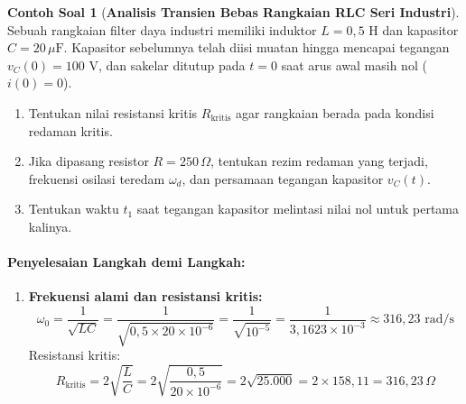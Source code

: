 \documentclass[11pt,a4paper]{article}
\theoremstyle{definition}
\newtheorem{example}{Contoh Soal}[section]
\begin{document}
\begin{example}[\textbf{Analisis Transien Bebas Rangkaian RLC Seri Industri}]
Sebuah rangkaian filter daya industri memiliki induktor $L = 0{,}5\text{ H}$ dan kapasitor $C = 20\,\mu\text{F}$. Kapasitor sebelumnya telah diisi muatan hingga mencapai tegangan $v_C(0) = 100\text{ V}$, dan sakelar ditutup pada $t = 0$ saat arus awal masih nol ($i(0) = 0$).
\begin{enumerate}[label=(\alph*)]
    \item Tentukan nilai resistansi kritis $R_{\text{kritis}}$ agar rangkaian berada pada kondisi redaman kritis.
    \item Jika dipasang resistor $R = 250\,\Omega$, tentukan rezim redaman yang terjadi, frekuensi osilasi teredam $\omega_d$, dan persamaan tegangan kapasitor $v_C(t)$.
    \item Tentukan waktu $t_1$ saat tegangan kapasitor melintasi nilai nol untuk pertama kalinya.
\end{enumerate}

\paragraph{Penyelesaian Langkah demi Langkah:}
\begin{enumerate}[label=(\alph*), leftmargin=*]
    \item \textbf{Frekuensi alami dan resistansi kritis:}
    \begin{equation*}
        \omega_0 = \frac{1}{\sqrt{LC}} = \frac{1}{\sqrt{0{,}5 \times 20 \times 10^{-6}}} = \frac{1}{\sqrt{10^{-5}}} = \frac{1}{3{,}1623 \times 10^{-3}} \approx 316{,}23\text{ rad/s}
    \end{equation*}
    Resistansi kritis:
    \begin{equation*}
        R_{\text{kritis}} = 2 \sqrt{\frac{L}{C}} = 2 \sqrt{\frac{0{,}5}{20 \times 10^{-6}}} = 2 \sqrt{25.000} = 2 \times 158{,}11 = 316{,}23\,\Omega
    \end{equation*}


\end{enumerate}
\end{example}
\end{document}
